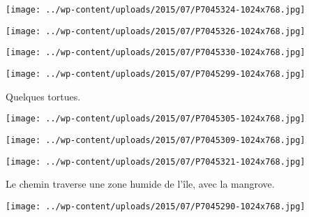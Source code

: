  

 

\begin{center} \texttt{[image: ../wp-content/uploads/2015/07/P7045324-1024x768.jpg]} \end{center}

 

 

\begin{center} \texttt{[image: ../wp-content/uploads/2015/07/P7045326-1024x768.jpg]} \end{center}

 

 

\begin{center} \texttt{[image: ../wp-content/uploads/2015/07/P7045330-1024x768.jpg]} \end{center}

 

 

\begin{center} \texttt{[image: ../wp-content/uploads/2015/07/P7045299-1024x768.jpg]} \end{center}

 

 Quelques tortues. 

 

\begin{center} \texttt{[image: ../wp-content/uploads/2015/07/P7045305-1024x768.jpg]} \end{center}

 

 

\begin{center} \texttt{[image: ../wp-content/uploads/2015/07/P7045309-1024x768.jpg]} \end{center}

 

 

\begin{center} \texttt{[image: ../wp-content/uploads/2015/07/P7045321-1024x768.jpg]} \end{center}

 

 Le chemin traverse une zone humide de l'île, avec la mangrove. 

 

\begin{center} \texttt{[image: ../wp-content/uploads/2015/07/P7045290-1024x768.jpg]} \end{center}

